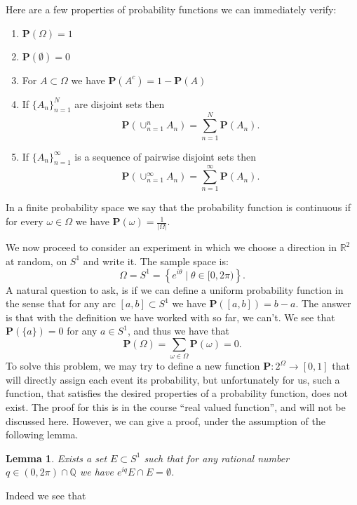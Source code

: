 \documentclass[11pt,a4paper]{article}
\theoremstyle{definition}
\theoremstyle{plain}
\newtheorem{lemma}[theorem]{Lemma}
\newcommand{\Q}{\mathbb{Q}}
\newcommand{\R}{\mathbb{R}}
\newcommand{\Prob}{\mathbf{P}}
\newcommand{\set}[2]{ \left\{ #1 \mid #2 \right\} }
\begin{document}
  Here are a few properties of probability functions we can immediately 
  verify:
  \begin{enumerate}
    \item $\Prob(\Omega) = 1$
    \item $\Prob(\emptyset) = 0$
    \item For $A \subset \Omega$ we have $\Prob(A^c) = 1 - \Prob(A)$
    \item If $\{A_n\}_{n=1}^{N}$ are disjoint sets then 
      \[
        \Prob\left(\cup_{n=1}^{n}{A_n}\right) = 
        \sum_{n=1}^{N}{\Prob(A_n)}.
      \]
    \item If $\{A_n\}_{n=1}^{\infty}$ is a sequence of pairwise disjoint sets 
      then
      \[
        \Prob\left(\cup_{n=1}^{\infty}{A_n}\right) = 
        \sum_{n=1}^{\infty}{\Prob(A_n)}.
      \]
  \end{enumerate}

  In a finite probability space we say that the probability function is
  continuous if for every $\omega \in \Omega$ we have 
  $\Prob(\omega) = \frac{1}{|\Omega|}$.

  We now proceed to consider an experiment in which we choose a direction in
  $\R^2$ at random, on $S^1$ and write it. The sample space is:
  \[
    \Omega = S^1 = \set{e^{i \theta}}{\theta \in [0,2 \pi)}.
  \]
  A natural question to ask, is if we can define a uniform probability function
  in the sense that for any arc $[a,b] \subset S^1$ we have 
  $\Prob([a,b]) = b - a$. The answer is that with the definition we have
  worked with so far, we can't. We see that $\Prob(\{a\}) = 0$ for 
  any $a \in S^1$, and thus we have that
  \[
    \Prob(\Omega) = \sum_{\omega \in \Omega}{\Prob(\omega)} = 0.
  \]
  To solve this problem, we may try to define a new function $\Prob \colon 
  2^\Omega \to [0,1]$ that will directly assign each event its probability,
  but unfortunately for us, such a function, that satisfies the desired
  properties of a probability function, does not exist. The proof for this
  is in the course ``real valued function'', and will not be discussed here.
  However, we can give a proof, under the assumption of the following lemma.

  \begin{lemma}
    Exists a set $E \subset S^1$ such that for any rational number 
    $q \in (0, 2 \pi) \cap \Q$ we have $e^{i q}E \cap E = \emptyset$.
  \end{lemma}

  Indeed we see that
\end{document}
